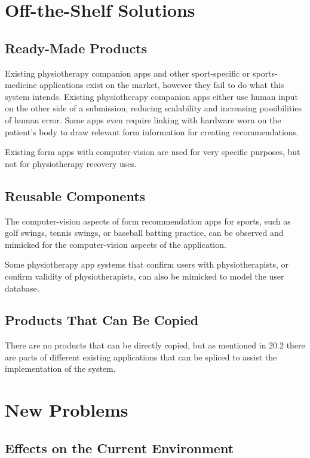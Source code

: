 \documentclass[12pt]{article}
\begin{document}
\section{Off-the-Shelf Solutions}
\subsection{Ready-Made Products}
Existing physiotherapy companion apps and other sport-specific or sports-medicine applications exist on the market, however they fail to do what this system intends. Existing physiotherapy companion apps either use human input on the other side of a submission, reducing scalability and increasing possibilities of human error. Some apps even require linking with hardware worn on the patient’s body to draw relevant form information for creating recommendations.

Existing form apps with computer-vision are used for very specific purposes, but not for physiotherapy recovery uses.

\subsection{Reusable Components}
The computer-vision aspects of form recommendation apps for sports, such as golf swings, tennis swings, or baseball batting practice, can be observed and mimicked for the computer-vision aspects of the application.

Some physiotherapy app systems that confirm users with physiotherapists, or confirm validity of physiotherapists, can also be mimicked to model the user database.

\subsection{Products That Can Be Copied}
There are no products that can be directly copied, but as mentioned in 20.2 there are parts of different existing applications that can be spliced to assist the implementation of the system.

\section{New Problems}
\subsection{Effects on the Current Environment}
\end{document}
